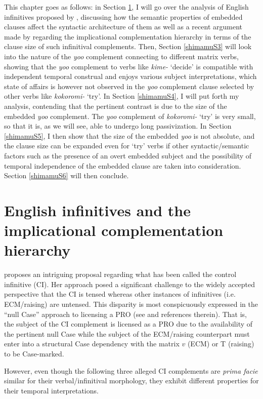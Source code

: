 \documentclass[output=paper]{langsci/langscibook}
\begin{document}
This chapter goes as follows: in Section \ref{shimamuS2}, I will go over the analysis of English infinitives proposed by \citet{Wurmbrand2014}, discussing how the semantic properties of embedded clauses affect the syntactic architecture of them as well as a recent argument made by \citet{wurmbrandlohninger2020} regarding the implicational complementation hierarchy in terms of the clause size of such infinitival complements. Then, Section \ref{shimamuS3} will look into the nature of the \textit{yoo} complement connecting to different matrix verbs, showing that the \textit{yoo} complement to verbs like \textit{kime-} `decide' is compatible with independent temporal construal and enjoys various subject interpretations, which state of affairs is however not observed in the \textit{yoo} complement clause selected by other verbs like \textit{kokoromi-} `try'. In Section \ref{shimamuS4}, I will put forth my analysis, contending that the pertinent contrast is due to the size of the embedded \textit{yoo} complement. The \textit{yoo} complement of \textit{kokoromi-} `try' is very small, so that it is, as we will see, able to undergo long passivization. In Section \ref{shimamuS5}, I then show that the size of the embedded \textit{yoo} is not absolute, and the clause size can be expanded even for `try' verbs if other syntactic/semantic factors such as the presence of an overt embedded subject and the possibility of temporal independence of the embedded clause are taken into consideration. Section \ref{shimamuS6} will then conclude.
 
\section{English infinitives and the implicational complementation hierarchy}\label{shimamuS2}
\citet{Wurmbrand2014} proposes an intriguing proposal regarding what has been called the control infinitive (CI). Her approach posed a significant challenge to the widely accepted perspective that the CI is tensed whereas other instances of infinitives (i.e. ECM/raising) are untensed. This disparity is most conspicuously expressed in the ``null Case'' approach to licensing a PRO (see \citealt{martin2001} and references therein). That is, the subject of the CI complement is licensed as a PRO due to the availability of the pertinent null Case while the subject of the ECM/raising counterpart must enter into a structural Case dependency with the matrix $v$ (ECM) or T (raising) to be Case-marked.

However, even though the following three alleged CI complements are \textit{prima facie} similar for their verbal/infinitival morphology, they exhibit different properties for their temporal interpretations.
\end{document}
